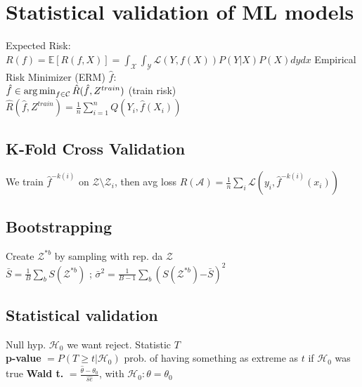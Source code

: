 \section*{Statistical validation of ML models}
Expected Risk: $R(f) = \mathbb{E}[R(f, X)] =\int_\mathcal{X} \int_\mathcal{Y}\mathcal{L}(Y, f(X))P(Y|X)P(X)dydx $
Empirical Risk Minimizer (ERM) $\hat{f}$:\\
$\hat{f} \in \operatorname*{arg\,min}_{f \in \mathcal{C}} \hat{R}(\hat{f}, Z^{train})$ (train risk)\\
$\hat{R}(\hat{f}, Z^{train}) = \frac{1}{n} \sum_{i=1}^n Q(Y_i, \hat{f}(X_i))$\\

\subsection*{K-Fold Cross Validation}
We train $\hat{f}^{-k(i)}$ on $\mathcal{Z}\setminus\mathcal{Z}_i$, then avg loss
$R(\mathcal{A})=\frac1n \sum_i \mathcal{L}(y_i, \hat{f}^{-k(i)}(x_i))$
\subsection*{Bootstrapping}
Create $\mathcal{Z}^{*b}$ by sampling with rep. da $\mathcal{Z}$\\
$\bar{S}\mathrm{=}\frac1B\sum_bS(\mathcal{Z}^{*b})$ ;
$\bar{\sigma}^2\mathrm{=}\frac1{B-1}\sum_b(S(\mathcal{Z}^{*b})\mathrm{-}\bar{S})^2$

\subsection*{Statistical validation}
Null hyp. $\mathcal{H}_0$ we want reject. Statistic $T$ \\
\textbf{p-value} $= P(T\geq t | \mathcal{H}_0)$ prob. of having something as extreme as $t$ if $\mathcal{H}_0$ was true
\textbf{Wald t.} $= \frac{\hat{\theta}-\theta_0}{\widehat{se}}$, with $\mathcal{H}_0:\theta=\theta_0$